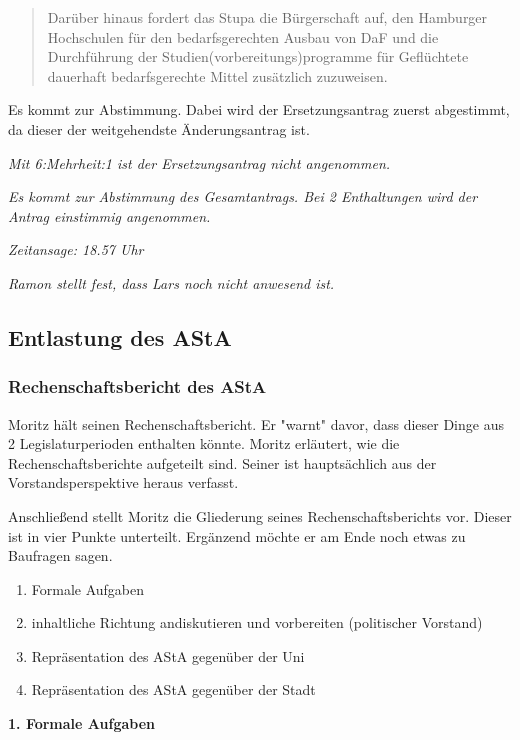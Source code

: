 \documentclass[ngerman,headheight=70pt]{scrartcl}
\begin{document}
    \blockquote{Darüber hinaus fordert das Stupa die Bürgerschaft auf, den Hamburger
    Hochschulen für den bedarfsgerechten Ausbau von DaF und die Durchführung
    der Studien(vorbereitungs)programme für Geflüchtete
    dauerhaft bedarfsgerechte Mittel zusätzlich zuzuweisen.}

    Es kommt zur Abstimmung. Dabei wird der Ersetzungsantrag zuerst abgestimmt,
    da dieser der weitgehendste Änderungsantrag ist.

    \textit{Mit 6:Mehrheit:1 ist der Ersetzungsantrag nicht angenommen.}

    \textit{Es kommt zur Abstimmung des Gesamtantrags. Bei 2 Enthaltungen wird
    der Antrag einstimmig angenommen.}

    \textit{Zeitansage: 18.57 Uhr}

    \textit{Ramon stellt fest, dass Lars noch nicht anwesend ist.}

    \subsection{Entlastung des AStA}

    \subsubsection{Rechenschaftsbericht des AStA}

    Moritz hält seinen Rechenschaftsbericht. Er "warnt" davor, dass dieser
    Dinge aus 2 Legislaturperioden enthalten könnte.
    Moritz erläutert, wie die Rechenschaftsberichte aufgeteilt sind. Seiner
    ist hauptsächlich aus der Vorstandsperspektive heraus verfasst.

    Anschließend stellt Moritz die Gliederung seines Rechenschaftsberichts
    vor. Dieser ist in vier Punkte unterteilt. Ergänzend möchte er am Ende noch
    etwas zu Baufragen sagen.

    \begin{enumerate}
        \item Formale Aufgaben
        \item inhaltliche Richtung andiskutieren und vorbereiten (politischer
        Vorstand)
        \item Repräsentation des AStA gegenüber der Uni
        \item Repräsentation des AStA gegenüber der Stadt
    \end{enumerate}

    \textbf{1. Formale Aufgaben}
\end{document}
